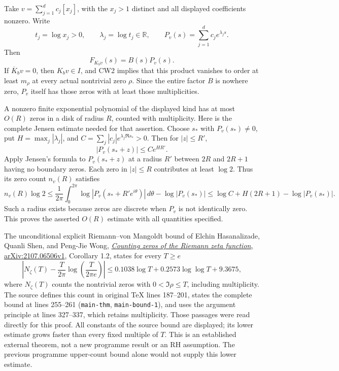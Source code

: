 Take \(v=\sum_{j=1}^d c_j[x_j]\), with the \(x_j>1\) distinct and all
displayed coefficients nonzero. Write \[
t_j=\log x_j>0,\qquad \lambda_j=\log t_j\in\mathbb R,\qquad
P_v(s)=\sum_{j=1}^d c_j e^{\lambda_j s}.
\tag{CW3.1}
\] Then \[
F_{K_bv}(s)=B(s)P_v(s).
\tag{CW3.2}
\] If \(\overline K_bv=0\), then \(K_bv\in I\), and CW2 implies that
this product vanishes to order at least \(m_\rho\) at every actual
nontrivial zero \(\rho\). Since the entire factor \(B\) is nowhere zero,
\(P_v\) itself has those zeros with at least those multiplicities.

A nonzero finite exponential polynomial of the displayed kind has at
most \(O(R)\) zeros in a disk of radius \(R\), counted with
multiplicity. Here is the complete Jensen estimate needed for that
assertion. Choose \(s_*\) with \(P_v(s_*)\ne0\), put
\(H=\max_j|\lambda_j|\), and \(C=\sum_j|c_j|e^{\lambda_j\Re s_*}>0\).
Then for \(|z|\le R'\), \[
|P_v(s_*+z)|\le C e^{HR'}.
\tag{CW3.3}
\] Apply Jensen's formula to \(P_v(s_*+z)\) at a radius \(R'\) between
\(2R\) and \(2R+1\) having no boundary zeros. Each zero in \(|z|\le R\)
contributes at least \(\log2\). Thus its zero count \(n_v(R)\) satisfies
\[
n_v(R)\log2
\le \frac1{2\pi}\int_0^{2\pi}
\log|P_v(s_*+R'e^{i\theta})|\,d\theta-\log|P_v(s_*)|
\le \log C+H(2R+1)-\log|P_v(s_*)|.
\tag{CW3.4}
\] Such a radius exists because zeros are discrete when \(P_v\) is not
identically zero. This proves the asserted \(O(R)\) estimate with all
quantities specified.

The unconditional explicit Riemann--von Mangoldt bound of Elchin
Hasanalizade, Quanli Shen, and Peng-Jie Wong,
\href{https://arxiv.org/abs/2107.06506v1}{\emph{Counting zeros of the
Riemann zeta function}, arXiv:2107.06506v1}, Corollary 1.2, states for
every \(T\ge e\) \[
\left|N_\zeta(T)-\frac{T}{2\pi}\log\left(\frac{T}{2\pi e}\right)\right|
\le0.1038\log T+0.2573\log\log T+9.3675,
\tag{CW3.5}
\] where \(N_\zeta(T)\) counts the nontrivial zeros with
\(0<\Im\rho\le T\), including multiplicity. The source defines this
count in original TeX lines 187--201, states the complete bound at lines
255--261 (\texttt{main-thm}, \texttt{main-bound-1}), and uses the
argument principle at lines 327--337, which retains multiplicity. Those
passages were read directly for this proof. All constants of the source
bound are displayed; its lower estimate grows faster than every fixed
multiple of \(T\). This is an established external theorem, not a new
programme result or an RH assumption. The previous programme upper-count
bound alone would not supply this lower estimate.

